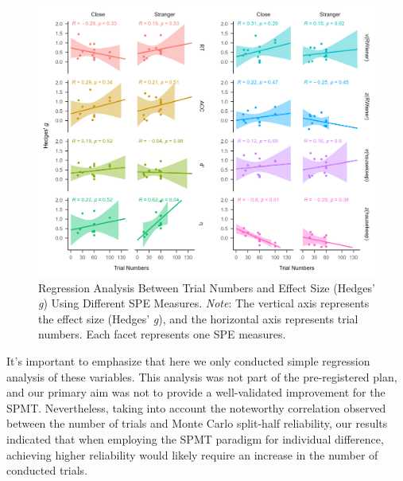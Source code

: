 \documentclass[sn-apa]{sn-jnl}%
\theoremstyle{thmstyleone}%
\theoremstyle{thmstyletwo}%
\theoremstyle{thmstylethree}%
\begin{document}
\begin{figure}[!ht]
	\centering
	\includegraphics[width=1\textwidth]{./Figure/Fig9_cor_yi&trials.png} 
	\caption[Regression Analysis Between Trial Numbers and Effect Size (Hedges’ \textit{g}) Using Different SPE Measures]{Regression Analysis Between Trial Numbers and Effect Size (Hedges’ \textit{g}) Using Different SPE Measures.  \textit{Note}: The vertical axis represents the effect size (Hedges’ \textit{g}), and the horizontal axis represents trial numbers. Each facet represents one SPE measures.
	}\label{fig:g_nTrial}
\end{figure}

It's important to emphasize that here we only conducted simple regression analysis of these variables. This analysis was not part of the pre-registered plan, and our primary aim was not to provide a well-validated improvement for the SPMT. Nevertheless, taking into account the noteworthy correlation observed between the number of trials and Monte Carlo split-half reliability, our results indicated that when employing the SPMT paradigm for individual difference, achieving higher reliability would likely require an increase in the number of conducted trials.
\clearpage
\printbibliography
\end{document}
